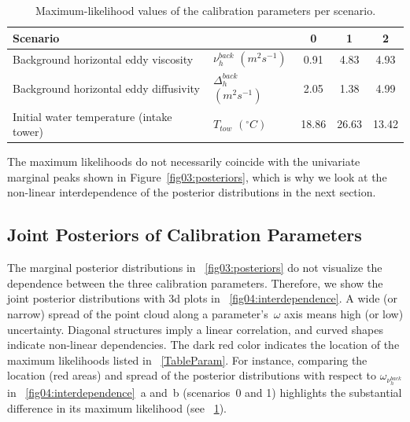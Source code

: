 \documentclass[draft,linenumbers,onecolumn]{agujournal2019} %
\begin{document}
\begin{table}
	\caption{Maximum-likelihood values of the calibration parameters per scenario.}
	\label{tab:max_likelihood}
	\centering
	\begin{tabular}{l l | c c c}%
		\hline
		\multicolumn{2}{l|}{Scenario}& 0 & 1 & 2\\
		\hline
		Background horizontal eddy viscosity & $\nu_{h}^{back}$ \((m^2s^{-1})\) &  0.91 & 4.83 & 4.93 \\
		Background horizontal eddy diffusivity & \(\Delta_{h}^{back}\) \( (m^2s^{-1})\) & 2.05 & 1.38 & 4.99 \\
		Initial water temperature (intake tower)& \(T_{tow}\)   \((^{\circ} C)\) & 18.86 & 26.63 & 13.42 \\
		\hline
	\end{tabular}
\end{table}

The maximum likelihoods do not necessarily coincide with the univariate marginal peaks shown in Figure~\ref{fig03:posteriors}, which is why we look at the non-linear interdependence of the posterior distributions in the next section.

\subsection{Joint Posteriors of Calibration Parameters}

The marginal posterior distributions in \figurename{~\ref{fig03:posteriors}} do not visualize the dependence between the three calibration parameters. Therefore, we show the joint posterior distributions with 3d plots in \figurename{~\ref{fig04:interdependence}}. A wide (or narrow) spread of the point cloud along a parameter's~$\omega$ axis means high (or low) uncertainty. Diagonal structures imply a linear correlation, and curved shapes indicate non-linear dependencies. The dark red color indicates the location of the maximum likelihoods listed in \tablename{~\ref{TableParam}}. For instance, comparing the location (red areas) and spread of the posterior distributions with respect to $\omega_{\nu_{h}^{back}}$ in \figurename{~\ref{fig04:interdependence}}~a and~b (scenarios~0 and 1) highlights the substantial difference in its maximum likelihood (see \tablename{~\ref{tab:max_likelihood}}).
\end{document}

